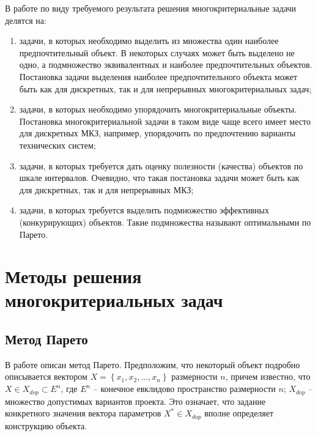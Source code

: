 \par В работе \cite{bib5} по виду требуемого результата решения многокритериальные задачи делятся на:
\begin{enumerate}[label=\arabic*)]
    \item задачи, в которых необходимо выделить из множества один наиболее предпочтительный объект. В некоторых случаях может быть выделено не одно, а подмножество эквивалентных и наиболее предпочтительных объектов. Постановка задачи выделения наиболее предпочтительного объекта может быть как для дискретных, так и для непрерывных многокритериальных задач;
    \item задачи, в которых необходимо упорядочить многокритериальные объекты. Постановка многокритериальной задачи в таком виде чаще всего имеет место для дискретных МКЗ, например, упорядочить по предпочтению варианты технических систем;
    \item задачи, в которых требуется дать оценку полезности (качества) объектов по шкале интервалов. Очевидно, что такая постановка задачи может быть как для дискретных, так и для непрерывных МКЗ;
    \item задачи, в которых требуется выделить подмножество эффективных (конкурирующих) объектов. Такие подмножества называют оптимальными по Парето.
\end{enumerate}

\section{Методы решения многокритериальных задач}
\subsection{Метод Парето}
В работе \cite{bib4} описан метод Парето.
Предположим, что некоторый объект подробно описывается вектором \begin{math} X = \left\{x_1, x_2, ..., x_n \right\} \end{math} размерности $n$, причем известно, что \begin{math} X \in X_{dop} \subset E^n \end{math}, где \begin{math}E^n\end{math} -- конечное евклидово пространство размерности $n$; \begin{math}X_{dop}\end{math} -- множество допустимых вариантов проекта. Это означает, что задание конкретного значения вектора параметров \begin{math} X^* \in X_{dop}\end{math} вполне определяет конструкцию объекта.

